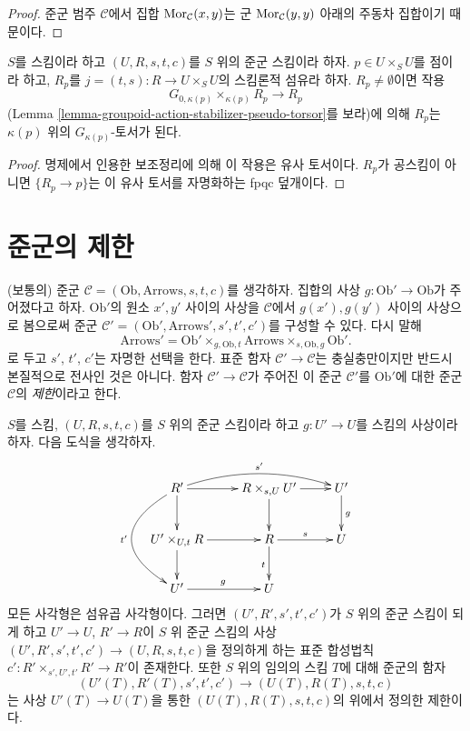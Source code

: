 \begin{proof}
준군 범주 $\mathcal{C}$에서 집합 $\mathop{\mathrm{Mor}}\nolimits_\mathcal{C}(x, y)$는 군 $\mathop{\mathrm{Mor}}\nolimits_\mathcal{C}(y, y)$ 아래의 주동차 집합이기 때문이다.
\end{proof}

\begin{lemma}
\label{lemma-fibres-j}
$S$를 스킴이라 하고 $(U, R, s, t, c)$를 $S$ 위의 준군 스킴이라 하자. $p \in U \times_S U$를 점이라 하고,
$R_p$를 $j = (t, s) : R \to U \times_S U$의 스킴론적 섬유라 하자. $R_p \not = \emptyset$이면 작용
$$
G_{0, \kappa(p)} \times_{\kappa(p)} R_p \longrightarrow R_p
$$
(Lemma \ref{lemma-groupoid-action-stabilizer-pseudo-torsor}를 보라)에 의해 $R_p$는 $\kappa(p)$ 위의
$G_{\kappa(p)}$-토서가 된다.
\end{lemma}

\begin{proof}
명제에서 인용한 보조정리에 의해 이 작용은 유사 토서이다. $R_p$가 공스킴이 아니면 $\{R_p \to p\}$는
이 유사 토서를 자명화하는 fpqc 덮개이다.
\end{proof}







\section{준군의 제한}
\label{section-restrict-groupoid}

\noindent
(보통의) 준군 $\mathcal{C} = (\text{Ob}, \text{Arrows}, s, t, c)$를 생각하자. 집합의 사상
$g : \text{Ob}' \to \text{Ob}$가 주어졌다고 하자. $\text{Ob}'$의 원소 $x', y'$ 사이의 사상을
$\mathcal{C}$에서 $g(x'), g(y')$ 사이의 사상으로 봄으로써 준군
$\mathcal{C}' = (\text{Ob}', \text{Arrows}', s', t', c')$를 구성할 수 있다. 다시 말해
$$
\text{Arrows}' =
\text{Ob}'
\times_{g, \text{Ob}, t}
\text{Arrows}
\times_{s, \text{Ob}, g}
\text{Ob}'.
$$
로 두고 $s'$, $t'$, $c'$는 자명한 선택을 한다. 표준 함자 $\mathcal{C}' \to \mathcal{C}$는 충실충만이지만
반드시 본질적으로 전사인 것은 아니다. 함자 $\mathcal{C}' \to \mathcal{C}$가 주어진 이 준군 $\mathcal{C}'$를
$\text{Ob}'$에 대한 준군 $\mathcal{C}$의 {\it 제한}이라고 한다.

\begin{lemma}
\label{lemma-restrict-groupoid}
$S$를 스킴, $(U, R, s, t, c)$를 $S$ 위의 준군 스킴이라 하고 $g : U' \to U$를 스킴의 사상이라 하자.
다음 도식을 생각하자.
$$
\xymatrix{
R' \ar[d] \ar[r] \ar@/_3pc/[dd]_{t'} \ar@/^1pc/[rr]^{s'}&
R \times_{s, U} U' \ar[r] \ar[d] &
U' \ar[d]^g \\
U' \times_{U, t} R \ar[d] \ar[r] &
R \ar[r]^s \ar[d]_t &
U \\
U' \ar[r]^g &
U
}
$$
모든 사각형은 섬유곱 사각형이다. 그러면 $(U', R', s', t', c')$가 $S$ 위의 준군 스킴이 되게 하고
$U' \to U$, $R' \to R$이 $S$ 위 준군 스킴의 사상
$(U', R', s', t', c') \to (U, R, s, t, c)$을 정의하게 하는 표준 합성법칙
$c' : R' \times_{s', U', t'} R' \to R'$이 존재한다. 또한 $S$ 위의 임의의 스킴 $T$에 대해 준군의 함자
$$
(U'(T), R'(T), s', t', c') \to (U(T), R(T), s, t, c)
$$
는 사상 $U'(T) \to U(T)$을 통한 $(U(T), R(T), s, t, c)$의 위에서 정의한 제한이다.
\end{lemma}

